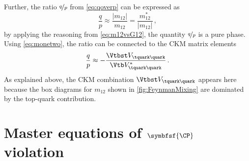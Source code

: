Further, the ratio $\nicefrac{q}{p}$ from \cref{eq:qoverp} can be expressed as
\begin{equation}
\frac{q}{p}\approx\frac{\left|m_{12}\right|}{m_{12}}=\frac{m_{12}^\ast}{\left|m_{12}\right|}\,,\label{eq:qoverPPurePhase}
\end{equation}
by applying the reasoning from \cref{eq:m12vsG12}, \ie the quantity $\nicefrac{q}{p}$ is a pure phase.
Using \cref{eq:monetwo}, the ratio can be connected to the CKM matrix elements
\begin{equation}
\frac{q}{p}\approx-\frac{\Vtbst V_{\tquark\quark}}{\Vtb V_{\tquark\quark}^\ast}\label{eq:qoverpCKM}\,.
\end{equation}
As explained above, the CKM combination $\Vtbst V_{\tquark\quark}$ appears here because the box diagrams for $m_{12}$ shown in \cref{fig:FeynmanMixing} are dominated by the top-quark contribution.


\section[head={Master equations of \CP violation},tocentry={Master equations of \CP violation}]{Master equations of $\symbfsf{\CP}$ violation}
\label{sec:formulaeCPV}

